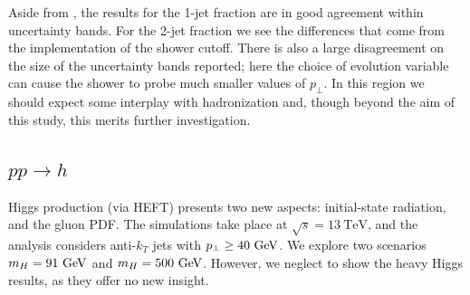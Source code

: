 Aside from \Herwig \QTilde, the results for the 1-jet fraction are in good agreement within uncertainty bands. For the 2-jet fraction we see the differences that come from the implementation of the shower cutoff. There is also a large disagreement on the size of the uncertainty bands reported; here the choice of evolution variable can cause the shower to probe much smaller values of $p_\perp$. In this region we should expect some interplay with hadronization and, though beyond the aim of this study, this merits further investigation.

\subsection{$pp\to h$}
\label{sec:psunc:results:h}
Higgs production (via HEFT) presents two new aspects: initial-state radiation, and the gluon PDF. The simulations take place at $\sqrt{s}=13~\mathrm{TeV}$, and the analysis considers anti-$k_T$ jets with $p_\perp\geq 40~\textrm{GeV}$. We explore two scenarios $m_H=91~\textrm{GeV}$ and $m_H=500~\textrm{GeV}$. However, we neglect to show the heavy Higgs results, as they offer no new insight.

